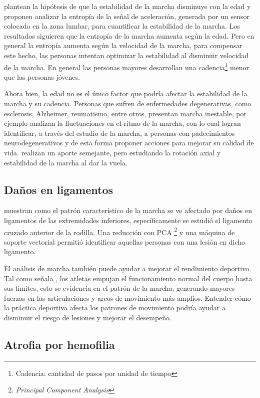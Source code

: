 \cite{arif} plantean la hipótesis de que la estabilidad de la marcha disminuye con la edad y proponen analizar la entropía de la señal de aceleración, generada por un sensor colocado en la zona lumbar, para cuantificar la estabilidad de la marcha. Los resultados siguieren que la entropía de la marcha aumenta según la edad. Pero en general la entropía aumenta según la velocidad de la marcha, para compensar este hecho, las personas intentan optimizar la estabilidad al disminuir velocidad de la marcha. En general las personas mayores desarrollan una cadencia\footnote{Cadencia: cantidad de pasos por unidad de tiempo} menor que las personas jóvenes. 

Ahora bien, la edad no es el único factor que podría afectar la estabilidad de la marcha y su cadencia. Personas que sufren de enfermedades degenerativas, como esclerosis, Alzheimer, reumatismo, entre otros, presentan marcha inestable, por ejemplo \cite{ren, wu} analizan la fluctuaciones en el ritmo de la marcha, con lo cual logran identificar, a través del estudio de la marcha, a personas con padecimientos neurodegenerativos y de esta forma proponer acciones para mejorar su calidad de vida. \cite{yang} realizan un aporte semejante, pero estudiando la rotación axial y estabilidad de la marcha al dar la vuela.  

\subsection{Daños en ligamentos}

\cite{christian} muestran como el patrón característico de la marcha se ve afectado por daños en ligamentos de las extremidades inferiores, específicamente se estudió el ligamento cruzado anterior de la rodilla. Una reducción con PCA \footnote{\emph{Principal Component Analysis}} y una máquina de soporte vectorial permitió identificar aquellas personas con una lesión en dicho ligamento. 

El análisis de marcha también puede ayudar a mejorar el rendimiento deportivo. Tal como señala \cite{perry}, los atletas empujan el funcionamiento normal del cuerpo hasta sus límites, esto se evidencia en el patrón de la marcha, generando mayores fuerzas en las articulaciones y arcos de movimiento más amplios. Entender cómo la práctica deportiva afecta los patrones de movimiento podría ayudar a disminuir el riesgo de lesiones y mejorar el desempeño.  

\subsection{Atrofia por hemofilia}

